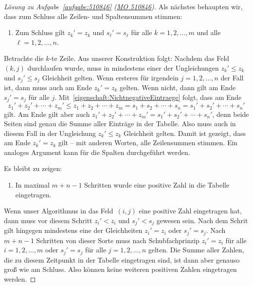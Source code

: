 \begin{proof}[Lösung zu Aufgabe~\ref{aufgabe:510846} \textmd{(\href{https://www.mathematik-olympiaden.de/moev/index.php?option=com_download&thema=a&format=raw&datei=A51084b.pdf}{MO 510846})}]
	Als nächstes behaupten wir, dass zum Schluss alle Zeilen- und Spaltensummen stimmen:
	\begin{enumerate}[resume,label={$(\arabic*)$},ref={$(\arabic*)$}]\itshape
		\item Zum Schluss gilt $z_k'=z_k$ und $s_\ell'=s_\ell$ für alle $k=1,2,\dotsc,m$ und alle $\ell=1,2,\dotsc,n$.\label{eigenschaft:RichtigeZeilenSpaltenSummen}
	\end{enumerate}
	Betrachte die $k$-te Zeile. Aus unserer Konstruktion folgt: Nachdem das Feld~$(k,j)$ durchlaufen wurde, muss in mindestens einer der Ungleichungen $z_k'\leqslant z_k$ und $s_j'\leqslant s_j$ Gleichheit gelten. Wenn ersteres für irgendein $j=1,2,\dotsc,n$ der Fall ist, dann muss auch am Ende $z_k'=z_k$ gelten. Wenn nicht, dann gilt am Ende $s_j'=s_j$ für alle $j$. Mit~\ref{eigenschaft:NichtnegativeEintraege} folgt, dass am Ende 
	\begin{equation*}
		z_1'+z_2'+\dotsb+z_m'\leqslant z_1+z_2+\dotsb+z_m=s_1+s_2+\dotsb+s_n=s_1'+s_2'+\dotsb+s_n'
	\end{equation*}
	gilt. Am Ende gilt aber auch $z_1'+z_2'+\dotsb+z_m'=s_1'+s_2'+\dotsb+s_n'$, denn beide Seiten sind genau die Summe aller Einträge in der Tabelle. Also muss auch in diesem Fall in der Ungleichung $z_k'\leqslant z_k$ Gleichheit gelten. Damit ist gezeigt, dass am Ende $z_k'=z_k$ gilt -- mit anderen Worten, alle Zeilensummen stimmen. Ein analoges Argument kann für die Spalten durchgeführt werden.
	
	Es bleibt zu zeigen:
	\begin{enumerate}[resume,label={$(\arabic*)$},ref={$(\arabic*)$}]\itshape
		\item In maximal $m+n-1$ Schritten wurde eine positive Zahl in die Tabelle eingetragen.\label{eigenschaft:PositiveEintraege}
	\end{enumerate}
	Wenn unser Algorithmus in das Feld~$(i,j)$ eine positive Zahl eingetragen hat, dann muss vor diesem Schritt $z_i'<z_i$ und $s_j'<s_j$ gewesen sein. Nach dem Schrit gilt hingegen mindestens eine der Gleichheiten $z_i'=z_i$ oder $s_j'=s_j$. Nach $m+n-1$ Schritten von dieser Sorte muss nach Schubfachprinzip $z_i'=z_i$ für alle $i=1,2,\dotsc,m$ oder $s_j'=s_j$ für alle $j=1,2,\dotsc,n$ gelten. Die Summe aller Zahlen, die zu diesem Zeitpunkt in der Tabelle eingetragen sind, ist dann aber genauso groß wie am Schluss. Also können keine weiteren positiven Zahlen eingetragen werden.
\end{proof}

